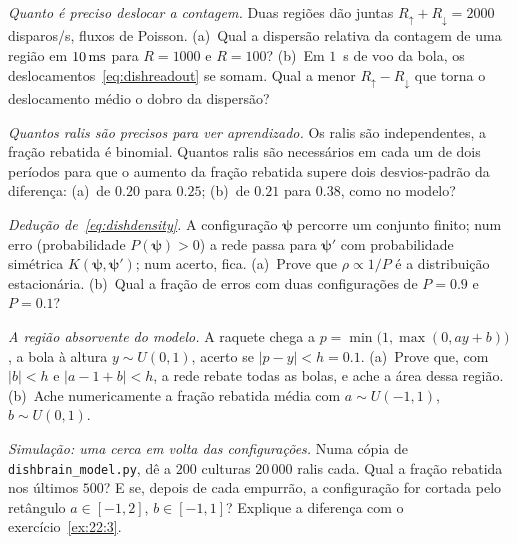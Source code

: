\begin{exercise}[\lvlA]
\label{ex:22:1}
\emph{Quanto é preciso deslocar a contagem.} Duas regiões dão juntas $R_\uparrow+R_\downarrow=2000$ disparos/s, fluxos de Poisson. (a)~Qual a dispersão relativa da contagem de uma região em $10\,\text{ms}$ para $R=1000$ e $R=100$? (b)~Em $1$~s de voo da bola, os deslocamentos~\eqref{eq:dishreadout} se somam. Qual a menor $R_\uparrow-R_\downarrow$ que torna o deslocamento médio o dobro da dispersão?
\end{exercise}

\begin{exercise}[\lvlA]
\label{ex:22:2}
\emph{Quantos ralis são precisos para ver aprendizado.} Os ralis são independentes, a fração rebatida é binomial. Quantos ralis são necessários em cada um de dois períodos para que o aumento da fração rebatida supere dois desvios-padrão da diferença: (a)~de $0.20$ para $0.25$; (b)~de $0.21$ para $0.38$, como no modelo?
\end{exercise}

\begin{exercise}[\lvlB]
\label{ex:22:3}
\emph{Dedução de~\eqref{eq:dishdensity}.} A configuração $\boldsymbol\psi$ percorre um conjunto finito; num erro (probabilidade $P(\boldsymbol\psi)>0$) a rede passa para $\boldsymbol\psi'$ com probabilidade simétrica $K(\boldsymbol\psi,\boldsymbol\psi')$; num acerto, fica. (a)~Prove que $\rho\propto1/P$ é a distribuição estacionária. (b)~Qual a fração de erros com duas configurações de $P=0.9$ e $P=0.1$?
\end{exercise}

\begin{exercise}[\lvlB]
\label{ex:22:4}
\emph{A região absorvente do modelo.} A raquete chega a $p=\min\bigl(1,\max(0,ay+b)\bigr)$, a bola à altura $y\sim U(0,1)$, acerto se $|p-y|<h=0.1$. (a)~Prove que, com $|b|<h$ e $|a-1+b|<h$, a rede rebate todas as bolas, e ache a área dessa região. (b)~Ache numericamente a fração rebatida média com $a\sim U(-1,1)$, $b\sim U(0,1)$.
\end{exercise}

\begin{exercise}[\lvlB]
\label{ex:22:5}
\emph{Simulação: uma cerca em volta das configurações.} Numa cópia de \texttt{dishbrain\_model.py}, dê a $200$ culturas $20\,000$ ralis cada. Qual a fração rebatida nos últimos $500$? E se, depois de cada empurrão, a configuração for cortada pelo retângulo $a\in[-1,2]$, $b\in[-1,1]$? Explique a diferença com o exercício~\ref{ex:22:3}.
\end{exercise}

